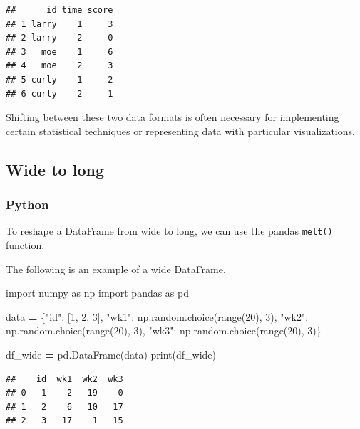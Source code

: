 \documentclass[
]{book}
\newenvironment{Shaded}{\begin{snugshade}}{\end{snugshade}}
\newcommand{\BuiltInTok}[1]{#1}
\newcommand{\DecValTok}[1]{\textcolor[rgb]{0.00,0.00,0.81}{#1}}
\newcommand{\ImportTok}[1]{#1}
\newcommand{\NormalTok}[1]{#1}
\newcommand{\OperatorTok}[1]{\textcolor[rgb]{0.81,0.36,0.00}{\textbf{#1}}}
\newcommand{\StringTok}[1]{\textcolor[rgb]{0.31,0.60,0.02}{#1}}
\begin{document}
\begin{verbatim}
##      id time score
## 1 larry    1     3
## 2 larry    2     0
## 3   moe    1     6
## 4   moe    2     3
## 5 curly    1     2
## 6 curly    2     1
\end{verbatim}

Shifting between these two data formats is often necessary for implementing certain statistical techniques or representing data with particular visualizations.

\hypertarget{wide-to-long}{%
\subsection{Wide to long}\label{wide-to-long}}

\hypertarget{python-32}{%
\subsubsection*{Python}\label{python-32}}

To reshape a DataFrame from wide to long, we can use the pandas \texttt{melt()} function.

The following is an example of a wide DataFrame.

\begin{Shaded}
\begin{Highlighting}[]
\ImportTok{import}\NormalTok{ numpy }\ImportTok{as}\NormalTok{ np}
\ImportTok{import}\NormalTok{ pandas }\ImportTok{as}\NormalTok{ pd}

\NormalTok{data }\OperatorTok{=}\NormalTok{ \{}\StringTok{"id"}\NormalTok{: [}\DecValTok{1}\NormalTok{, }\DecValTok{2}\NormalTok{, }\DecValTok{3}\NormalTok{],}
        \StringTok{"wk1"}\NormalTok{: np.random.choice(}\BuiltInTok{range}\NormalTok{(}\DecValTok{20}\NormalTok{), }\DecValTok{3}\NormalTok{),}
        \StringTok{"wk2"}\NormalTok{: np.random.choice(}\BuiltInTok{range}\NormalTok{(}\DecValTok{20}\NormalTok{), }\DecValTok{3}\NormalTok{),}
        \StringTok{"wk3"}\NormalTok{: np.random.choice(}\BuiltInTok{range}\NormalTok{(}\DecValTok{20}\NormalTok{), }\DecValTok{3}\NormalTok{)\}}

\NormalTok{df\_wide }\OperatorTok{=}\NormalTok{ pd.DataFrame(data)}
\BuiltInTok{print}\NormalTok{(df\_wide)}
\end{Highlighting}
\end{Shaded}

\begin{verbatim}
##    id  wk1  wk2  wk3
## 0   1    2   19    0
## 1   2    6   10   17
## 2   3   17    1   15
\end{verbatim}
\end{document}
